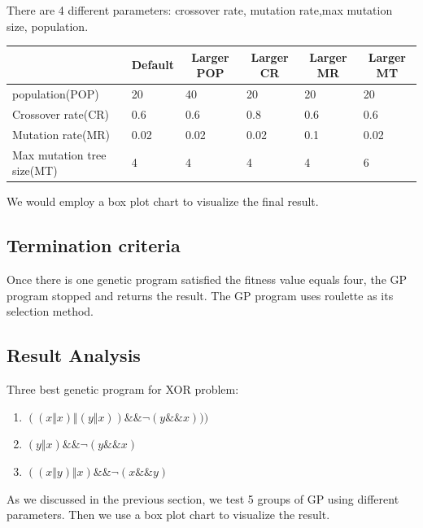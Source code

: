 \documentclass[11pt, a4paper, oneside, openright]{article}
\begin{document}
There  are 4 different parameters: crossover rate, mutation rate,max mutation size, population.
\begin{table}[H]
\begin{tabular}{|l|l|l|l|l|l|}
\hline
\multicolumn{1}{|c|}{\textbf{}} & \multicolumn{1}{c|}{\textbf{Default}} & \multicolumn{1}{c|}{\textbf{Larger POP}} &\multicolumn{1}{c|}{\textbf{Larger CR}} &\multicolumn{1}{c|}{\textbf{Larger MR}} &\multicolumn{1}{c|}{\textbf{Larger MT}}\\
\hline
population(POP)    &20     &40        &20    &20 &20                    \\
\hline
Crossover rate(CR)    &0.6  &0.6   &0.8   &0.6 &0.6                   \\
\hline
Mutation rate(MR)  &0.02  &0.02  &0.02  &0.1 &0.02              \\
\hline
Max mutation tree size(MT)    &4  &4 &4  &4 &6                     \\
\hline
\end{tabular}
\end{table}
We would employ a box plot chart to visualize the final result.

\subsection{Termination criteria}
Once there is one genetic program satisfied the fitness value equals four, the GP program stopped and returns the result. The GP program uses roulette as its selection method.

\subsection{Result Analysis}
Three best genetic program for XOR problem:
\begin{enumerate}
\item $((x \Vert  x) \Vert (y \Vert x)) \&\&  \lnot(y \&\& x)))$
\item $(y \Vert x) \&\& \lnot(y \&\& x)$
\item $((x \Vert y) \Vert x)  \&\& \lnot(x \&\& y)$
\end{enumerate}

As we discussed in the previous section,  we  test 5 groups of GP using different parameters. Then we use a box plot  chart to visualize the result.
\end{document}
